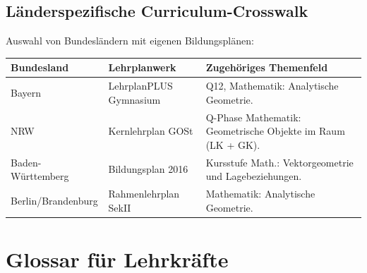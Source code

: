 \documentclass[12pt,a4paper]{scrartcl}
\begin{document}
\subsection{Länderspezifische Curriculum-Crosswalk}\label{ap:laender}

Auswahl von Bundesländern mit eigenen Bildungsplänen:

\begin{center}
\small
\begin{tabularx}{\textwidth}{@{}p{}p{}X@{}}
\toprule
\textbf{Bundesland} & \textbf{Lehrplanwerk} & \textbf{Zugehöriges Themenfeld} \\
\midrule
Bayern & LehrplanPLUS Gymnasium & Q12, Mathematik: Analytische Geometrie. \\
\addlinespace[3pt]
NRW & Kernlehrplan GOSt & Q-Phase Mathematik: Geometrische Objekte im Raum (LK + GK). \\
\addlinespace[3pt]
Baden-Württemberg & Bildungsplan 2016 & Kursstufe Math.: Vektorgeometrie und Lagebeziehungen. \\
\addlinespace[3pt]
Berlin/Brandenburg & Rahmenlehrplan SekII & Mathematik: Analytische Geometrie. \\
\bottomrule
\end{tabularx}
\end{center}

\newpage
\section{Glossar für Lehrkräfte}\label{ap:glos}
\end{document}
